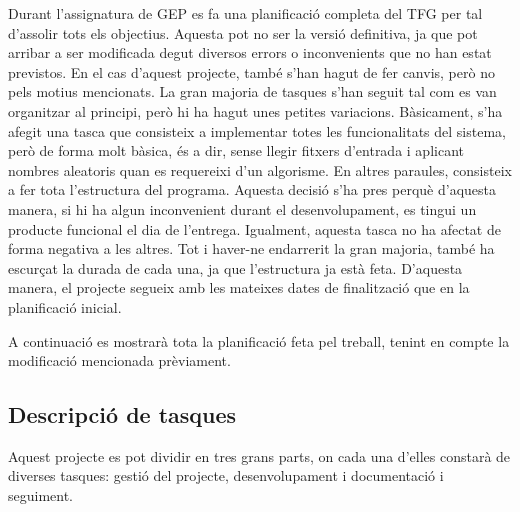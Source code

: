 \documentclass[a4paper]{article}
\begin{document}
Durant l'assignatura de GEP es fa una planificació completa del TFG per tal d'assolir tots els objectius. Aquesta pot no ser la versió definitiva, ja que pot arribar a ser modificada degut diversos errors o inconvenients que no han estat previstos. En el cas d'aquest projecte, també s'han hagut de fer canvis, però no pels motius mencionats. La gran majoria de tasques s'han seguit tal com es van organitzar al principi, però hi ha hagut unes petites variacions. Bàsicament, s'ha afegit una tasca que consisteix a implementar totes les funcionalitats del sistema, però de forma molt bàsica, és a dir, sense llegir fitxers d'entrada i aplicant nombres aleatoris quan es requereixi d'un algorisme. En altres paraules, consisteix a fer tota l'estructura del programa. Aquesta decisió s'ha pres perquè d'aquesta manera, si hi ha algun inconvenient durant el desenvolupament, es tingui un producte funcional el dia de l'entrega. Igualment, aquesta tasca no ha afectat de forma negativa a les altres. Tot i haver-ne endarrerit la gran majoria, també ha escurçat la durada de cada una, ja que l'estructura ja està feta. D'aquesta manera, el projecte segueix amb les mateixes dates de finalització que en la planificació inicial.

A continuació es mostrarà tota la planificació feta pel treball, tenint en compte la modificació mencionada prèviament.

\subsection{Descripció de tasques}
Aquest projecte es pot dividir en tres grans parts, on cada una d'elles constarà de diverses tasques: gestió del projecte, desenvolupament i documentació i seguiment.
\end{document}

